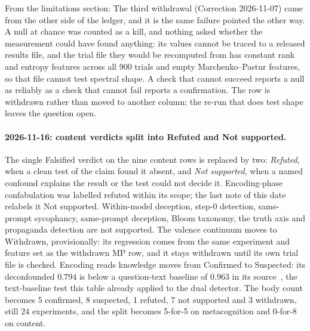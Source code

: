 \documentclass[11pt,a4paper]{article}
\begin{document}
From the limitations section:
The third withdrawal (Correction 2026-11-07) came from the other side of the
ledger, and it is the same failure pointed the other way. A null at chance was
counted as a kill, and nothing asked whether the measurement could have found
anything: its values cannot be traced to a released results file, and the
trial file they would be recomputed from has constant rank and entropy
features across all 900 trials and empty Marchenko--Pastur features, so that
file cannot test spectral shape. A check that cannot succeed reports a null as reliably as a check that
cannot fail reports a confirmation. The row is withdrawn rather than moved to
another column; the re-run that does test shape leaves the question open.

\paragraph{2026-11-16: content verdicts split into Refuted and Not supported.}
The single Falsified verdict on the nine content rows is replaced by
two: \emph{Refuted}, when a clean test of the claim found it absent,
and \emph{Not supported}, when a named confound explains the result or
the test could not decide it. Encoding-phase confabulation was
labelled refuted within its scope; the last note of this date
relabels it Not supported. Within-model deception, step-0 detection,
same-prompt sycophancy, same-prompt deception, Bloom taxonomy, the
truth axis and propaganda detection are not supported. The valence
continuum moves to Withdrawn, provisionally: its regression comes from
the same experiment and feature set as the withdrawn MP row, and it
stays withdrawn until its own trial file is checked. Encoding reads
knowledge moves from Confirmed to Suspected: its deconfounded $0.794$
is below a question-text baseline of $0.963$ in its
source~\citep{lyra2026decision}, the text-baseline test this table
already applied to the dual detector. The body count becomes 5
confirmed, 8 suspected, 1 refuted, 7 not supported and 3 withdrawn,
still 24 experiments, and the split becomes 5-for-5 on metacognition
and 0-for-8 on content.
\end{document}
